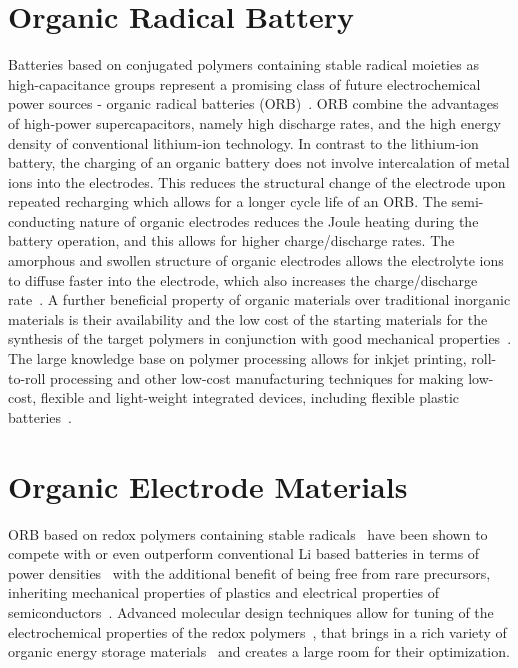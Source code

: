 \section{Organic Radical Battery}

Batteries based on conjugated polymers containing stable radical moieties as high-capacitance groups represent a promising class of future electrochemical power sources - organic radical batteries (ORB)~\cite{nakahara2002_cpl, nishide2004_electact,xie2021_mathoriz,Rohland2022}. ORB combine the advantages of high-power supercapacitors, namely high discharge rates, and the high energy density of conventional lithium-ion technology. In contrast to the lithium-ion battery, the charging of an organic battery does not involve intercalation of metal ions into the electrodes. This reduces the structural change of the electrode upon repeated recharging which allows for a longer cycle life of an ORB. The semi-conducting nature of organic electrodes reduces the Joule heating during the battery operation, and this allows for higher charge/discharge rates. The amorphous and swollen structure of organic electrodes allows the electrolyte ions to diffuse faster into the electrode, which also increases the charge/discharge rate~\cite{nishide_2009}. A further beneficial property of organic materials over traditional inorganic materials is their availability and the low cost of the starting materials for the synthesis of the target polymers in conjunction with good mechanical properties~\cite{janoschka2012_advmater, muench2016_chemrev, friebe2017_topcurrchem}. The large knowledge base on polymer processing allows for inkjet printing, roll-to-roll processing and other low-cost manufacturing techniques for making low-cost, flexible and light-weight integrated devices, including flexible plastic batteries~\cite{janoschka2012_advmater,nishide_2009}. 
\par


\section{Organic Electrode Materials}
ORB based on redox polymers containing stable radicals~\cite{nakahara2002_cpl} have been shown to compete with or even outperform  conventional Li based batteries in terms of power densities~\cite{IWASA2007} with the additional benefit of being free from rare precursors, inheriting mechanical properties of plastics and electrical properties of semiconductors~\cite{friebe2017_topcurrchem,Casado2021,Goujon2021}. Advanced molecular design techniques allow for tuning of the electrochemical properties of the redox polymers~\cite{Janoschka2017}, that brings in a rich variety of organic energy storage materials~\cite{Xie2021,Vereshchagin2022,Janoschka2017a} and creates a large room for their optimization. 

